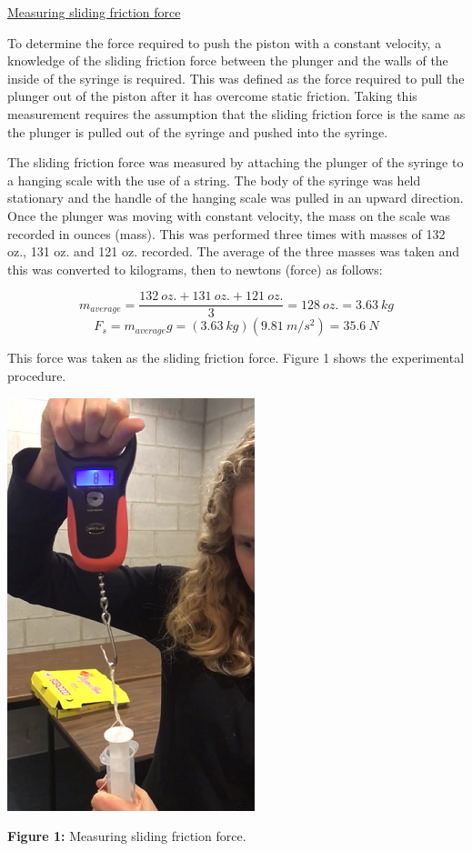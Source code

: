 \documentclass{article}
\begin{document}
\underline{Measuring sliding friction force}

To determine the force required to push the piston with a constant velocity, a knowledge of the sliding friction force between the plunger and the walls of the inside of the syringe is required. 
This was defined as the force required to pull the plunger out of the piston after it has overcome static friction.
Taking this measurement requires the assumption that the sliding friction force is the same as the plunger is pulled out of the syringe and pushed into the syringe.

The sliding friction force was measured by attaching the plunger of the syringe to a hanging scale with the use of a string. 
The body of the syringe was held stationary and the handle of the hanging scale was pulled in an upward direction.
Once the plunger was moving with constant velocity, the mass on the scale was recorded in ounces (mass).
This was performed three times with masses of 132 oz., 131 oz. and 121 oz. recorded.
The average of the three masses was taken and this was converted to kilograms, then to newtons (force) as follows:

\[ m_{average} = \frac{132 \ oz. + 131 \ oz. + 121 \ oz.}{3} = 128 \ oz. = 3.63 \ kg \]
\[ F_{s} = m_{average}g = (3.63 \ kg)(9.81 \ m/s^2) = 35.6 \ N \] 

This force was taken as the sliding friction force. Figure 1 shows the experimental procedure.

\begin{center}\includegraphics{MeasuringSlidingFriction.png}\end{center}
\begin{center}\textbf{Figure 1:} Measuring sliding friction force. \end{center}
\end{document}
